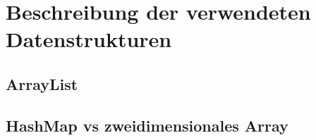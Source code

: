 \section{Beschreibung der verwendeten Datenstrukturen}

\subsection{ArrayList}

\subsection{HashMap vs zweidimensionales Array}

